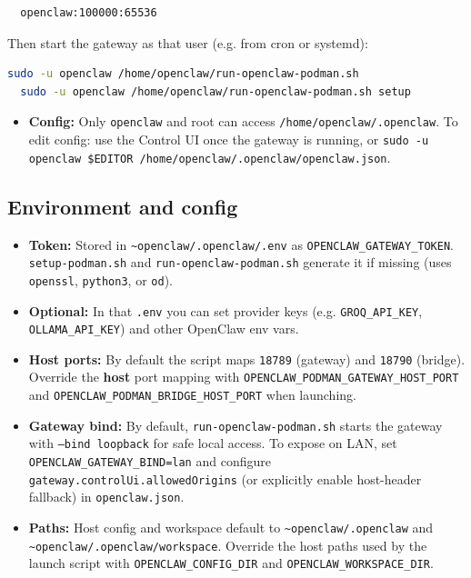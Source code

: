 \begin{lstlisting}
  openclaw:100000:65536
\end{lstlisting}


Then start the gateway as that user (e.g. from cron or systemd):

\begin{lstlisting}[language=bash]
  sudo -u openclaw /home/openclaw/run-openclaw-podman.sh
  sudo -u openclaw /home/openclaw/run-openclaw-podman.sh setup
\end{lstlisting}


\begin{itemize}
  \item \textbf{Config:} Only \texttt{openclaw} and root can access \texttt{/home/openclaw/.openclaw}. To edit config: use the Control UI once the gateway is running, or \texttt{sudo -u openclaw \$EDITOR /home/openclaw/.openclaw/openclaw.json}.
\end{itemize}


\subsection{Environment and config}


\begin{itemize}
  \item \textbf{Token:} Stored in \texttt{\textasciitilde{}openclaw/.openclaw/.env} as \texttt{OPENCLAW\_GATEWAY\_TOKEN}. \texttt{setup-podman.sh} and \texttt{run-openclaw-podman.sh} generate it if missing (uses \texttt{openssl}, \texttt{python3}, or \texttt{od}).
  \item \textbf{Optional:} In that \texttt{.env} you can set provider keys (e.g. \texttt{GROQ\_API\_KEY}, \texttt{OLLAMA\_API\_KEY}) and other OpenClaw env vars.
  \item \textbf{Host ports:} By default the script maps \texttt{18789} (gateway) and \texttt{18790} (bridge). Override the \textbf{host} port mapping with \texttt{OPENCLAW\_PODMAN\_GATEWAY\_HOST\_PORT} and \texttt{OPENCLAW\_PODMAN\_BRIDGE\_HOST\_PORT} when launching.
  \item \textbf{Gateway bind:} By default, \texttt{run-openclaw-podman.sh} starts the gateway with \texttt{--bind loopback} for safe local access. To expose on LAN, set \texttt{OPENCLAW\_GATEWAY\_BIND=lan} and configure \texttt{gateway.controlUi.allowedOrigins} (or explicitly enable host-header fallback) in \texttt{openclaw.json}.
  \item \textbf{Paths:} Host config and workspace default to \texttt{\textasciitilde{}openclaw/.openclaw} and \texttt{\textasciitilde{}openclaw/.openclaw/workspace}. Override the host paths used by the launch script with \texttt{OPENCLAW\_CONFIG\_DIR} and \texttt{OPENCLAW\_WORKSPACE\_DIR}.
\end{itemize}


